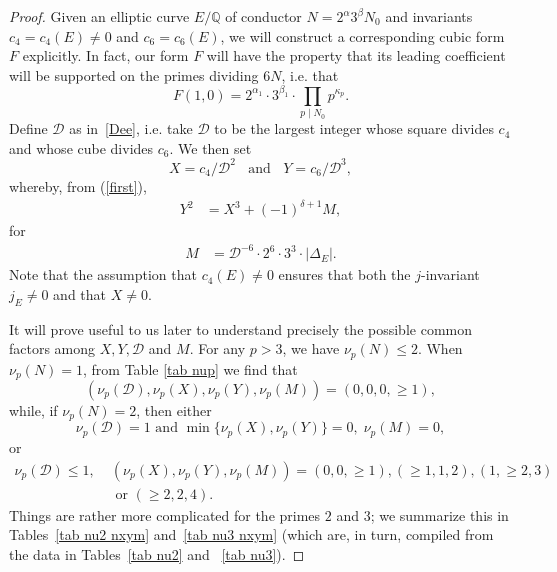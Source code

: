\documentclass[11pt]{report}
\theoremstyle{definition}
\begin{document}
\begin{proof}
Given an elliptic curve $E/\mathbb{Q}$ of conductor $N=2^\alpha 3^\beta N_0$ and invariants $c_4= c_4(E) \neq 0$ and
$c_6=c_6(E)$, we will construct a corresponding cubic form $F$ explicitly. In fact, our form $F$ will have the property that its leading coefficient will be supported on the primes dividing $6N$, i.e. that
$$
F(1,0) = 2^{\alpha_1} \cdot 3^{\beta_1} \cdot \prod_{p \mid N_0} p^{\kappa_p}.
$$
Define $\mathcal{D}$ as in~\eqref{Dee}, i.e. take
$\mathcal{D}$ to be the largest integer whose square divides $c_4$ and whose cube divides $c_6$. We then set
$$
X = c_4/\mathcal{D}^2 \; \; \mbox{ and } \; \; Y = c_6/\mathcal{D}^3,
$$
whereby, from (\ref{first}),
\begin{align} \label{first2}
Y^2 &= X^3 + (-1)^{\delta +1}  M,
\end{align}
for
\begin{align*}
M &=\mathcal{D}^{-6} \cdot 2^6 \cdot 3^3 \cdot |\Delta_E|.
\end{align*}
Note that the assumption that $c_4(E) \neq 0$ ensures that both the $j$-invariant $j_E \neq 0$ and that $X \neq 0$.

It will prove useful to us later to understand precisely the possible common factors among $X, Y, \mathcal{D}$ and $M$.
For any $p>3$, we have $\nu_p(N) \leq 2$. When
$\nu_p(N)=1$, from Table \ref{tab nup} we find that
\begin{equation} \label{super-1}
( \nu_p (\mathcal{D}), \nu_p (X), \nu_p (Y), \nu_p (M)) = (0,0,0, \geq 1),
\end{equation}
while, if $\nu_p (N)=2$, then either
\begin{equation} \label{super0}
\nu_p (\mathcal{D}) = 1 \mbox{ and }  \min \{ \nu_p (X), \nu_p (Y) \} = 0, \; \nu_p (M)=0 ,
\end{equation}
or
%
\begin{align} \label{super}
\nu_p (\mathcal{D}) \leq 1, \;
&(\nu_p (X), \nu_p (Y), \nu_p (M) ) = (0,0, \geq 1), (\geq 1, 1, 2), (1, \geq 2, 3) \\
&\mbox{ or } (\geq 2, 2, 4).
\end{align}
Things are rather more complicated for the primes $2$ and $3$; we summarize this in Tables~\ref{tab nu2 nxym} and~\ref{tab nu3
nxym} (which are, in turn, compiled from the data in Tables~\ref{tab nu2} and ~\ref{tab nu3}).


\end{proof}
\end{document}
